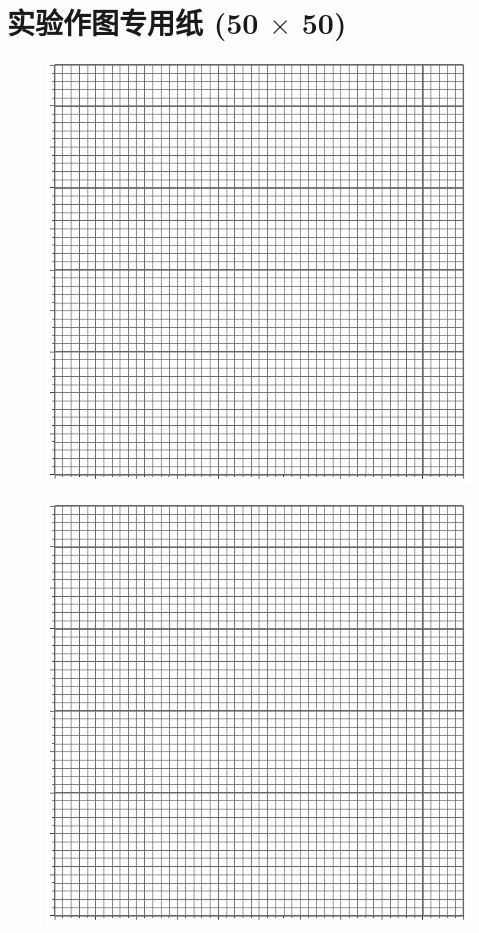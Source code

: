 \documentclass[UTF8]{article}
\begin{document}
\section*{实验作图专用纸 (50 $\times$ 50)}

\begin{figure}[H]\centering
\includegraphics[width=\columnwidth]{assets/50x50.pdf}
\end{figure}

\begin{figure}[H]\centering
\includegraphics[width=0.8\columnwidth]{assets/50x50.pdf}
\end{figure}
\end{document}
